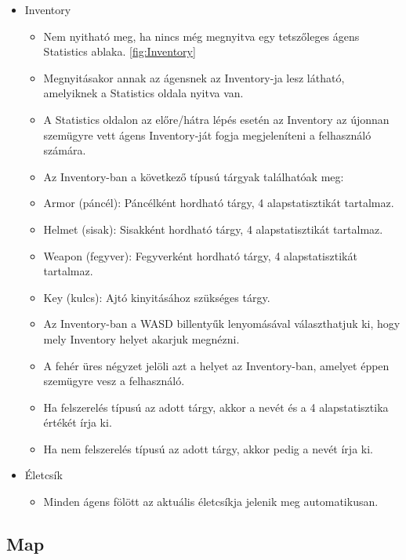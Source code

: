 \begin{itemize}
    \item Inventory
    
    \begin{itemize}
        \item Nem nyitható meg, ha nincs még megnyitva egy tetszőleges ágens Statistics ablaka. \ref{fig:Inventory}
        \item Megnyitásakor annak az ágensnek az Inventory-ja lesz látható, amelyiknek a Statistics oldala nyitva van.
        \item A Statistics oldalon az előre/hátra lépés esetén az Inventory az újonnan szemügyre vett ágens Inventory-ját fogja megjeleníteni a felhasználó számára.
        \item Az Inventory-ban a következő típusú tárgyak találhatóak meg:
        \item Armor (páncél): Páncélként hordható tárgy, 4 alapstatisztikát tartalmaz.
        \item Helmet (sisak): Sisakként hordható tárgy, 4 alapstatisztikát tartalmaz.
        \item Weapon (fegyver): Fegyverként hordható tárgy, 4 alapstatisztikát tartalmaz.
        \item Key (kulcs): Ajtó kinyitásához szükséges tárgy.
        \item Az Inventory-ban a WASD billentyűk lenyomásával választhatjuk ki, hogy mely Inventory helyet akarjuk megnézni.
        \item A fehér üres négyzet jelöli azt a helyet az Inventory-ban, amelyet éppen szemügyre vesz a felhasználó.
        \item Ha felszerelés típusú az adott tárgy, akkor a nevét és a 4 alapstatisztika értékét írja ki.
        \item Ha nem felszerelés típusú az adott tárgy, akkor pedig a nevét írja ki.
    \end{itemize}

    \item Életcsík
    
    \begin{itemize}
        \item Minden ágens fölött az aktuális életcsíkja jelenik meg automatikusan.
    \end{itemize}


\end{itemize}


\subsection{Map}


